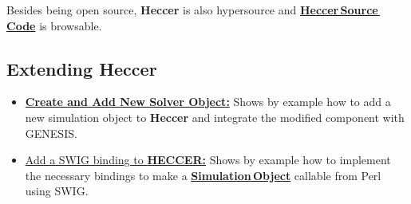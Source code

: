 \documentclass[12pt]{article}
\begin{document}
Besides being open source, {\bf Heccer} is also hypersource and \href{http://repo-genesis3.cbi.utsa.edu/crossref/heccer/heccer/index.html}{\bf Heccer\,Source\,Code} is browsable.

\subsection*{Extending Heccer}
\begin{itemize}
   \item \href{../genesis-add-object-solver/genesis-add-object-solver.tex}{\bf Create and Add New Solver Object:} Shows by example how to add a new simulation object to {\bf Heccer} and integrate the modified component with GENESIS.
   \item \href{../genesis-add-swigbinding-heccer/genesis-add-swigbinding-heccer.tex}{Add a SWIG binding to {\bf HECCER:}} Shows by example how to implement the necessary bindings to make a \href{../simulation-objects/simulation-objects.tex}{\bf Simulation\,Object} callable from Perl using SWIG.
\end{itemize}
\end{document}
